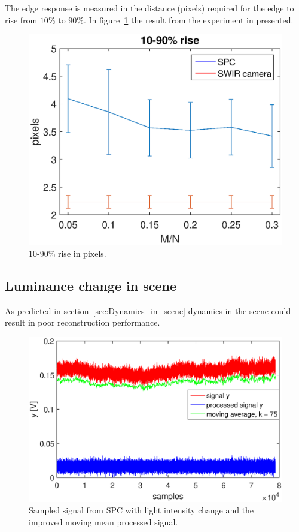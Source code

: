

The edge response is measured in the distance (pixels) required for the edge to rise from $10\%$ to $90\%$. In figure~\ref{fig:rise} the result from the experiment in presented. 

\begin{figure}[H]
    \centering
    \includegraphics[width=0.7\linewidth]{result/mtf/Rise10_90.eps}
    \caption{10-90\% rise in pixels.}
    \label{fig:rise}
\end{figure}


\subsection{Luminance change in scene}
As predicted in section~\ref{sec:Dynamics_in_scene} dynamics in the scene could result in poor reconstruction performance.  

\begin{figure}[H]
\includegraphics[width = 0.7\linewidth]{result/luminance/li.eps}
	\caption{Sampled signal from SPC with light intensity change and the improved moving mean processed signal.}
	\label{fig:lc_plot}
\end{figure}


